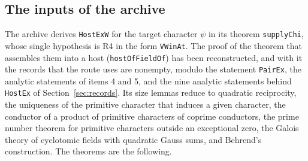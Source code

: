 \documentclass[11pt,letterpaper]{article}
\numberwithin{equation}{section}
\begin{document}
\subsection{The inputs of the archive}

The archive derives \texttt{HostExW} for the target character $\psi$ in its theorem \texttt{supplyChi}, whose single hypothesis is R4 in the form \texttt{VWinAt}. The proof of the theorem that assembles them into a host (\texttt{hostOfFieldOf}) has been reconstructed, and with it the records that the route uses are nonempty, modulo the statement \texttt{PairEx}, the analytic statements of items 4 and 5, and the nine analytic statements behind \texttt{HostEx} of Section~\ref{sec:records}. Its size lemmas reduce to quadratic reciprocity, the uniqueness of the primitive character that induces a given character, the conductor of a product of primitive characters of coprime conductors, the prime number theorem for primitive characters outside an exceptional zero, the Galois theory of cyclotomic fields with quadratic Gauss sums, and Behrend's construction. The theorems are the following.
\end{document}
